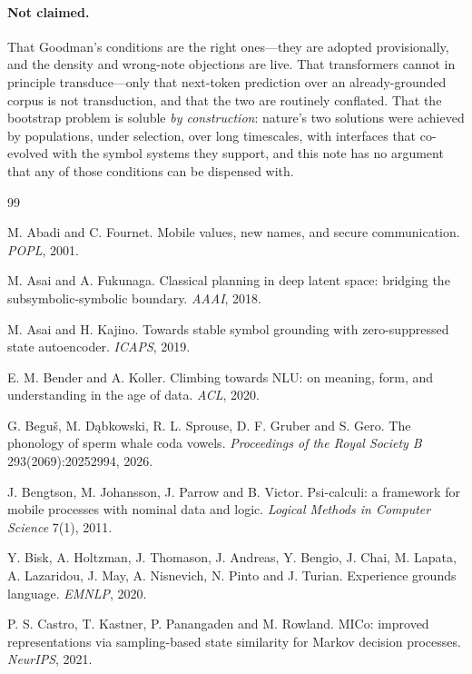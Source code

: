 \documentclass[11pt,a4paper]{article}
\theoremstyle{definition}
\theoremstyle{plain}
\theoremstyle{remark}
\begin{document}
\paragraph{Not claimed.} That Goodman's conditions are the right ones---they are adopted
provisionally, and the density and wrong-note objections are live. That transformers
cannot in principle transduce---only that next-token prediction over an already-grounded
corpus is not transduction, and that the two are routinely conflated. That the bootstrap
problem is soluble \emph{by construction}: nature's two solutions were achieved by
populations, under selection, over long timescales, with interfaces that co-evolved with
the symbol systems they support, and this note has no argument that any of those
conditions can be dispensed with.

\begin{thebibliography}{99}

 M. Abadi and C. Fournet. Mobile values, new names, and secure
communication. \emph{POPL}, 2001.

 M. Asai and A. Fukunaga. Classical planning in deep latent space:
bridging the subsymbolic-symbolic boundary. \emph{AAAI}, 2018.

 M. Asai and H. Kajino. Towards stable symbol grounding with
zero-suppressed state autoencoder. \emph{ICAPS}, 2019.

 E. M. Bender and A. Koller. Climbing towards NLU: on meaning,
form, and understanding in the age of data. \emph{ACL}, 2020.

 G. Beguš, M. Dąbkowski, R. L. Sprouse, D. F. Gruber and S. Gero. The
phonology of sperm whale coda vowels. \emph{Proceedings of the Royal Society B}
293(2069):20252994, 2026.

 J. Bengtson, M. Johansson, J. Parrow and B. Victor. Psi-calculi: a
framework for mobile processes with nominal data and logic. \emph{Logical Methods in
Computer Science} 7(1), 2011.

 Y. Bisk, A. Holtzman, J. Thomason, J. Andreas, Y. Bengio, J. Chai,
M. Lapata, A. Lazaridou, J. May, A. Nisnevich, N. Pinto and J. Turian. Experience grounds
language. \emph{EMNLP}, 2020.

 P. S. Castro, T. Kastner, P. Panangaden and M. Rowland. MICo:
improved representations via sampling-based state similarity for Markov decision
processes. \emph{NeurIPS}, 2021.


\end{thebibliography}
\end{document}
